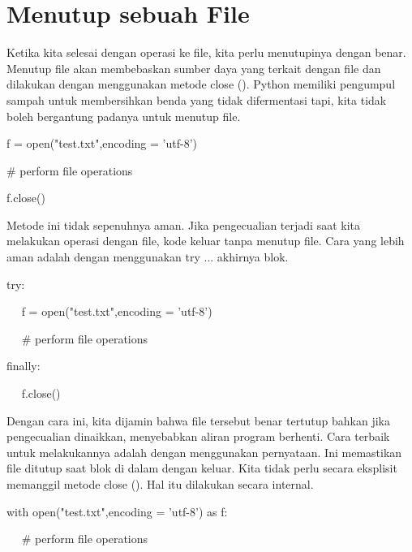 \section{Menutup sebuah File}
Ketika kita selesai dengan operasi ke file, kita perlu menutupinya dengan benar. Menutup file akan membebaskan sumber daya yang terkait dengan file dan dilakukan dengan menggunakan metode close (). Python memiliki pengumpul sampah untuk membersihkan benda yang tidak difermentasi tapi, kita tidak boleh bergantung padanya untuk menutup file. \par
\noindent 
f = open("test.txt",encoding = 'utf-8') \par
\noindent 
$  \#  $ perform file operations \par
\noindent 
f.close() \par
\vspace{12pt}
\noindent 
Metode ini tidak sepenuhnya aman. Jika pengecualian terjadi saat kita melakukan operasi dengan file, kode keluar tanpa menutup file. Cara yang lebih aman adalah dengan menggunakan try ... akhirnya blok. \par
\vspace{12pt}
\noindent 
try: \par
\noindent 
~~ f = open("test.txt",encoding = 'utf-8') \par
\noindent 
~~  $  \#  $ perform file operations \par
\noindent 
finally: \par
\noindent 
~~ f.close() \par
\vspace{12pt}
Dengan cara ini, kita dijamin bahwa file tersebut benar tertutup bahkan jika pengecualian dinaikkan, menyebabkan aliran program berhenti. Cara terbaik untuk melakukannya adalah dengan menggunakan pernyataan. Ini memastikan file ditutup saat blok di dalam dengan keluar. Kita tidak perlu secara eksplisit memanggil metode close (). Hal itu dilakukan secara internal. \par
\vspace{12pt}
\noindent 
with open("test.txt",encoding = 'utf-8') as f: \par
\noindent 
~~  $  \#  $ perform file operations \par
\vspace{12pt}
\noindent 
